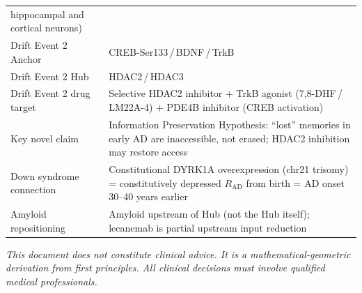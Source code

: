 \documentclass[12pt,a4paper]{article}
\newcommand{\RAD}{R_{\mathrm{AD}}}
\begin{document}
\begin{center}
\begin{tabular}{p{4.4cm}p{9.0cm}}
hippocampal and cortical neurons) \\
Drift Event 2 Anchor &
CREB-Ser133\,/\,BDNF\,/\,TrkB \\
Drift Event 2 Hub &
HDAC2\,/\,HDAC3 \\
Drift Event 2 drug target &
Selective HDAC2 inhibitor +
TrkB agonist (7,8-DHF\,/\,LM22A-4) +
PDE4B inhibitor (CREB activation) \\
\midrule
Key novel claim &
Information Preservation Hypothesis:
``lost'' memories in early AD are
inaccessible, not erased; HDAC2
inhibition may restore access \\
Down syndrome connection &
Constitutional DYRK1A overexpression
(chr21 trisomy) = constitutively
depressed $\RAD$ from birth =
AD onset 30--40 years earlier \\
Amyloid repositioning &
Amyloid upstream of Hub
(not the Hub itself); lecanemab
is partial upstream input reduction \\
\bottomrule
\end{tabular}
\end{center}

\bigskip\noindent
\textit{This document does not constitute clinical advice.
It is a mathematical-geometric derivation from first
principles. All clinical decisions must involve
qualified medical professionals.}
\end{document}
